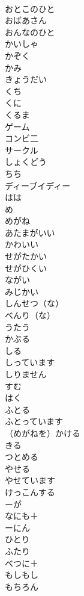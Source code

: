 \documentclass[8pt]{extreport}
\begin{document}
\begin{CJK}{UTF8}{min}
\\	おとこのひと	
\\	おばあさん	
\\	おんなのひと	
\\	かいしゃ	
\\	かぞく	
\\	かみ	
\\	きょうだい	
\\	くち	
\\	くに	
\\	くるま	
\\	ゲーム	
\\	コンビ二	
\\	サークル	
\\	しょくどう	
\\	ちち	
\\	ディーブイディー	
\\	はは	
\\	め	
\\	めがね	
\\	あたまがいい	
\\	かわいい	
\\	せがたかい	
\\	せがひくい	
\\	ながい	
\\	みじかい	
\\	しんせつ（な）	
\\	べんり（な）	
\\	うたう	
\\	かぶる	
\\	しる	
\\	しっています	
\\	しりません	
\\	すむ	
\\	はく	
\\	ふとる	
\\	ふとっています	
\\	（めがねを）かける	
\\	きる	
\\	つとめる	
\\	やせる	
\\	やせています	
\\	けっこんする	
\\	ーが	
\\	なにも＋
\\	ーにん	
\\	ひとり	
\\	ふたり	
\\	べつに＋
\\	もしもし	
\\	もちろん	

\end{CJK}
\end{document}
